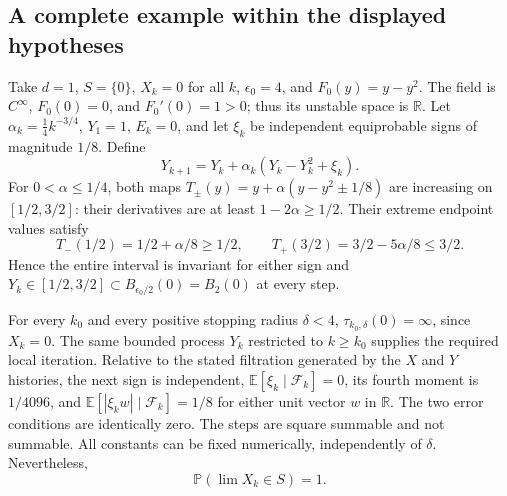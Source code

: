\documentclass[10pt]{article}
\begin{document}
\subsection*{A complete example within the displayed hypotheses}
Take \(d=1\), \(S=\{0\}\), \(X_k=0\) for all \(k\), \(\epsilon_0=4\), and \(F_0(y)=y-y^2\). The field is \(C^\infty\), \(F_0(0)=0\), and \(F_0'(0)=1>0\); thus its unstable space is \(\mathbb R\). Let \(\alpha_k=\frac14 k^{-3/4}\), \(Y_1=1\), \(E_k=0\), and let \(\xi_k\) be independent equiprobable signs of magnitude \(1/8\). Define \[Y_{k+1}=Y_k+\alpha_k(Y_k-Y_k^2+\xi_k).\] For \(0<\alpha\le1/4\), both maps \(T_\pm(y)=y+\alpha(y-y^2\pm1/8)\) are increasing on \([1/2,3/2]\): their derivatives are at least \(1-2\alpha\ge1/2\). Their extreme endpoint values satisfy \[T_-(1/2)=1/2+\alpha/8\ge1/2,\qquad
 T_+(3/2)=3/2-5\alpha/8\le3/2.\] Hence the entire interval is invariant for either sign and \(Y_k\in[1/2,3/2]\subset B_{\epsilon_0/2}(0)=B_2(0)\) at every step.\par
For every \(k_0\) and every positive stopping radius \(\delta<4\), \(\tau_{k_0,\delta}(0)=\infty\), since \(X_k=0\). The same bounded process \(Y_k\) restricted to \(k\ge k_0\) supplies the required local iteration. Relative to the stated filtration generated by the \(X\) and \(Y\) histories, the next sign is independent, \(\mathbb E[\xi_k\mid\mathcal F_k]=0\), its fourth moment is \(1/4096\), and \(\mathbb E[|\xi_k w|\mid\mathcal F_k]=1/8\) for either unit vector \(w\) in \(\mathbb R\). The two error conditions are identically zero. The steps are square summable and not summable. All constants can be fixed numerically, independently of \(\delta\). Nevertheless, \[\mathbb P(\lim X_k\in S)=1.\]\par
\end{document}
